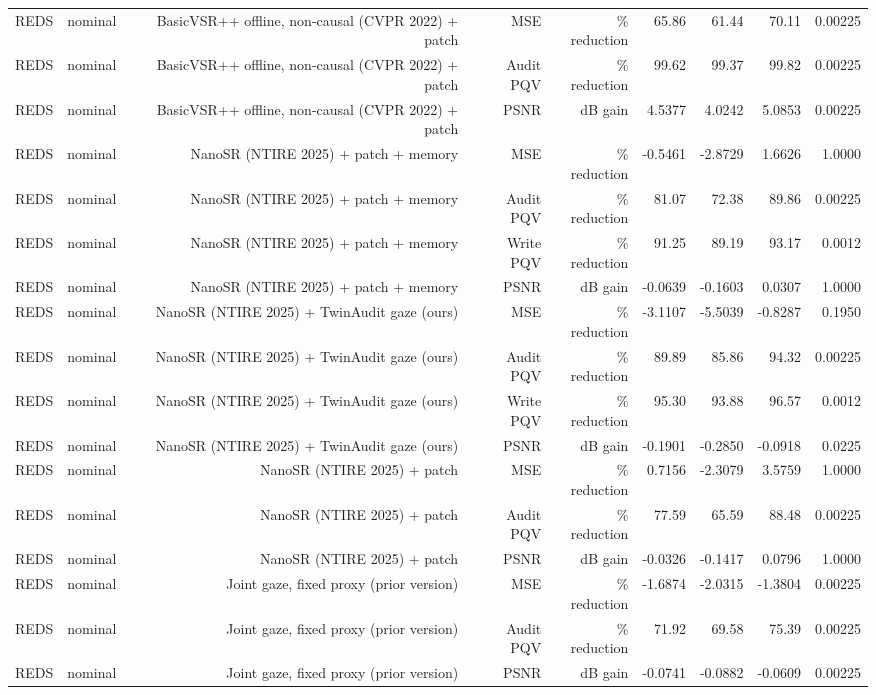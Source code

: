 \begin{table}[t]
\begin{tabular}{llrrrrrrr}
REDS & nominal & BasicVSR++ offline, non-causal (CVPR 2022) + patch & MSE & \% reduction & 65.86 & 61.44 & 70.11 & 0.00225 \\
REDS & nominal & BasicVSR++ offline, non-causal (CVPR 2022) + patch & Audit PQV & \% reduction & 99.62 & 99.37 & 99.82 & 0.00225 \\
REDS & nominal & BasicVSR++ offline, non-causal (CVPR 2022) + patch & PSNR & dB gain & 4.5377 & 4.0242 & 5.0853 & 0.00225 \\
REDS & nominal & NanoSR (NTIRE 2025) + patch + memory & MSE & \% reduction & -0.5461 & -2.8729 & 1.6626 & 1.0000 \\
REDS & nominal & NanoSR (NTIRE 2025) + patch + memory & Audit PQV & \% reduction & 81.07 & 72.38 & 89.86 & 0.00225 \\
REDS & nominal & NanoSR (NTIRE 2025) + patch + memory & Write PQV & \% reduction & 91.25 & 89.19 & 93.17 & 0.0012 \\
REDS & nominal & NanoSR (NTIRE 2025) + patch + memory & PSNR & dB gain & -0.0639 & -0.1603 & 0.0307 & 1.0000 \\
REDS & nominal & NanoSR (NTIRE 2025) + TwinAudit gaze (ours) & MSE & \% reduction & -3.1107 & -5.5039 & -0.8287 & 0.1950 \\
REDS & nominal & NanoSR (NTIRE 2025) + TwinAudit gaze (ours) & Audit PQV & \% reduction & 89.89 & 85.86 & 94.32 & 0.00225 \\
REDS & nominal & NanoSR (NTIRE 2025) + TwinAudit gaze (ours) & Write PQV & \% reduction & 95.30 & 93.88 & 96.57 & 0.0012 \\
REDS & nominal & NanoSR (NTIRE 2025) + TwinAudit gaze (ours) & PSNR & dB gain & -0.1901 & -0.2850 & -0.0918 & 0.0225 \\
REDS & nominal & NanoSR (NTIRE 2025) + patch & MSE & \% reduction & 0.7156 & -2.3079 & 3.5759 & 1.0000 \\
REDS & nominal & NanoSR (NTIRE 2025) + patch & Audit PQV & \% reduction & 77.59 & 65.59 & 88.48 & 0.00225 \\
REDS & nominal & NanoSR (NTIRE 2025) + patch & PSNR & dB gain & -0.0326 & -0.1417 & 0.0796 & 1.0000 \\
REDS & nominal & Joint gaze, fixed proxy (prior version) & MSE & \% reduction & -1.6874 & -2.0315 & -1.3804 & 0.00225 \\
REDS & nominal & Joint gaze, fixed proxy (prior version) & Audit PQV & \% reduction & 71.92 & 69.58 & 75.39 & 0.00225 \\
REDS & nominal & Joint gaze, fixed proxy (prior version) & PSNR & dB gain & -0.0741 & -0.0882 & -0.0609 & 0.00225 \\

\end{tabular}
\end{table}
